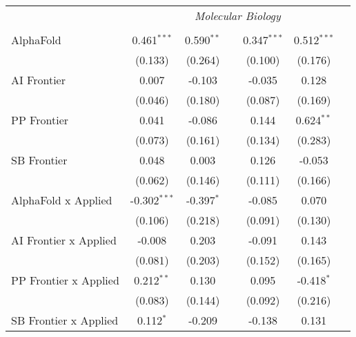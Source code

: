 \begin{tabular}{lcccccc}
 & \multicolumn{6}{c}{\textit{Molecular Biology}} \\ \\
   AlphaFold                      & 0.461$^{***}$  & 0.590$^{**}$ &                & 0.347$^{***}$ & 0.512$^{***}$ &   \\   
                                  & (0.133)        & (0.264)      &                & (0.100)       & (0.176)       &   \\   
   AI Frontier                    & 0.007          & -0.103       &                & -0.035        & 0.128         &   \\   
                                  & (0.046)        & (0.180)      &                & (0.087)       & (0.169)       &   \\   
   PP Frontier                    & 0.041          & -0.086       &                & 0.144         & 0.624$^{**}$  &   \\   
                                  & (0.073)        & (0.161)      &                & (0.134)       & (0.283)       &   \\   
   SB Frontier                    & 0.048          & 0.003        &                & 0.126         & -0.053        &   \\   
                                  & (0.062)        & (0.146)      &                & (0.111)       & (0.166)       &   \\   
   AlphaFold x Applied            & -0.302$^{***}$ & -0.397$^{*}$ &                & -0.085        & 0.070         &   \\   
                                  & (0.106)        & (0.218)      &                & (0.091)       & (0.130)       &   \\   
   AI Frontier x Applied          & -0.008         & 0.203        &                & -0.091        & 0.143         &   \\   
                                  & (0.081)        & (0.203)      &                & (0.152)       & (0.165)       &   \\   
   PP Frontier x Applied          & 0.212$^{**}$   & 0.130        &                & 0.095         & -0.418$^{*}$  &   \\   
                                  & (0.083)        & (0.144)      &                & (0.092)       & (0.216)       &   \\   
   SB Frontier x Applied          & 0.112$^{*}$    & -0.209       &                & -0.138        & 0.131         &   \\   

\end{tabular}
